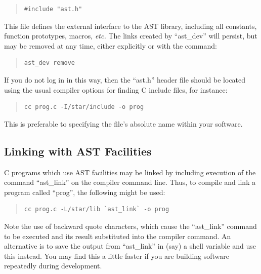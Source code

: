 \documentclass[twoside,11pt]{article}
\newcommand{\htmlref}[2]{#1}
\begin{document}
\begin{quote}
\small
\begin{verbatim}
#include "ast.h"
\end{verbatim}
\normalsize
\end{quote}

This file defines the external interface to the AST library, including
all constants, function prototypes, macros, {\em{etc.}}
The links created by ``\htmlref{ast\_dev}{ast_dev}'' will persist, but may be removed at
any time, either explicitly or with the command:

\begin{quote}
\small
\begin{verbatim}
ast_dev remove
\end{verbatim}
\normalsize
\end{quote}

If you do not log in in this way, then the ``ast.h'' header file
should be located using the usual compiler options for finding C
include files, for instance:

\begin{quote}
\small
\begin{verbatim}
cc prog.c -I/star/include -o prog
\end{verbatim}
\normalsize
\end{quote}

This is preferable to specifying the file's absolute name within your
software.

\subsection{\label{ss:linking}Linking with AST Facilities}

C programs which use AST facilities may be linked by including
execution of the command ``\htmlref{ast\_link}{ast_link}'' on the compiler command
line. Thus, to compile and link a program called ``prog'', the
following might be used:

\begin{quote}
\small
\begin{verbatim}
cc prog.c -L/star/lib `ast_link` -o prog
\end{verbatim}
\normalsize
\end{quote}

Note the use of backward quote characters, which cause the
``ast\_link'' command to be executed and its result substituted into
the compiler command. An alternative is to save the output from
``ast\_link'' in (say) a shell variable and use this instead. You may
find this a little faster if you are building software repeatedly
during development.
\end{document}
